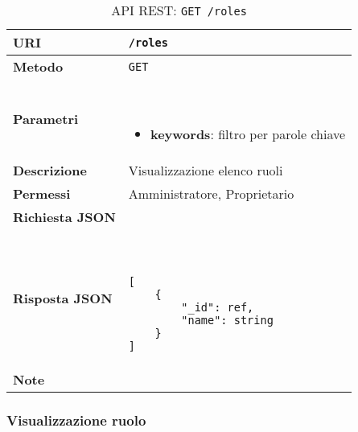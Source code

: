         \begin{table}[H]
            \begin{center}
                \begin{tabular}{p{} p{}}
                    \toprule
                    \textbf{URI} & \texttt{/roles} \\ \midrule
                    \textbf{Metodo} & \texttt{GET} \\ \midrule
                    \textbf{Parametri} & \
                        \begin{itemize}
                            \item \textbf{keywords}: filtro per parole chiave
                        \end{itemize}
                        \\ \midrule
                    \textbf{Descrizione} & Visualizzazione elenco ruoli \\ \midrule
                    \textbf{Permessi} & Amministratore, Proprietario  \\ \midrule
                    \textbf{Richiesta JSON} & \\ \midrule
                    \textbf{Risposta JSON} & \
                        \begin{lstlisting}[basicstyle={\ttfamily}]
[
    {
        "_id": ref,
        "name": string
    }
]
                        \end{lstlisting}
                        \\ \midrule
                    \textbf{Note} & \\
                    \bottomrule
                \end{tabular}
                \caption{API REST: \texttt{GET /roles}}
            \end{center}
        \end{table}

    \subsubsection{Visualizzazione ruolo}

